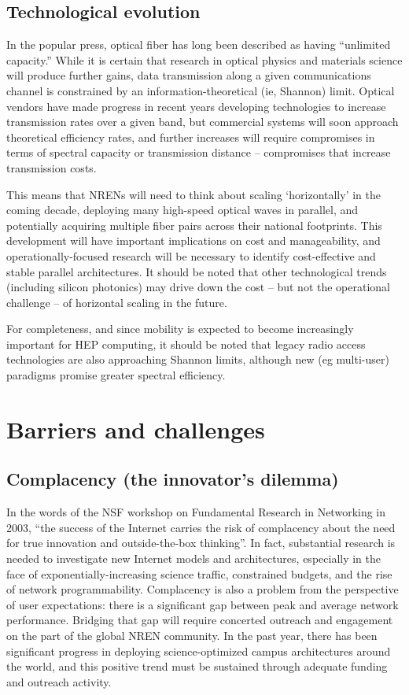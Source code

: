 \subsection{Technological evolution} 

In the popular press, optical fiber has long been described as having “unlimited capacity.” While it is certain that research in optical physics and materials science will produce further gains, data transmission along a given communications channel is constrained by an information-theoretical (ie, Shannon) limit.  Optical vendors have made progress in recent years developing technologies to increase transmission rates over a given band, but commercial systems will soon approach theoretical efficiency rates, and further increases will require compromises in terms of spectral capacity or transmission distance – compromises that increase transmission costs.  

This means that NRENs will need to think about scaling ‘horizontally’ in the coming decade, deploying many high-speed optical waves in parallel, and potentially acquiring multiple fiber pairs across their national footprints. This development will have important implications on cost and manageability, and operationally-focused research will be necessary to identify cost-effective and stable parallel architectures. It should be noted that other technological trends (including silicon photonics) may drive down the cost – but not the operational challenge – of horizontal scaling in the future. 

For completeness, and since mobility is expected to become increasingly important for HEP computing, it should be noted that legacy radio access technologies are also approaching Shannon limits, although new (eg multi-user) paradigms promise greater spectral efficiency.

\section{Barriers and challenges} 

\subsection{Complacency (the innovator’s dilemma)}

In the words of the NSF workshop on Fundamental Research in Networking in 2003, “the success of the Internet carries the risk of complacency about the need for true innovation and outside-the-box thinking”.  In fact, substantial  research is needed to investigate new Internet models and architectures, especially in the face of exponentially-increasing science traffic, constrained budgets, and the rise of network programmability. Complacency is also a problem from the perspective of user expectations: there is a significant gap between peak and average network performance. Bridging that gap will require concerted outreach and engagement on the part of the global NREN community. In the past year, there has been significant progress in deploying science-optimized campus architectures around the world, and this positive trend must be sustained through adequate funding and outreach activity.   

